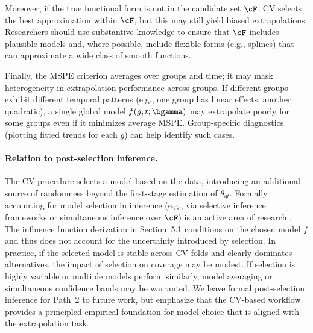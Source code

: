 Moreover, if the true functional form is not in the candidate set $\cF$, CV selects the best approximation within $\cF$, but this may still yield biased extrapolations. Researchers should use substantive knowledge to ensure that $\cF$ includes plausible models and, where possible, include flexible forms (e.g., splines) that can approximate a wide class of smooth functions.

Finally, the MSPE criterion averages over groups and time; it may mask heterogeneity in extrapolation performance across groups. If different groups exhibit different temporal patterns (e.g., one group has linear effects, another quadratic), a single global model $f(g,t;\bgamma)$ may extrapolate poorly for some groups even if it minimizes average MSPE. Group-specific diagnostics (plotting fitted trends for each $g$) can help identify such cases.

\paragraph{Relation to post-selection inference.}
The CV procedure selects a model based on the data, introducing an additional source of randomness beyond the first-stage estimation of $\theta_{gt}$. Formally accounting for model selection in inference (e.g., via selective inference frameworks or simultaneous inference over $\cF$) is an active area of research \citep{tibshiraniExactPostselectionInference2016,chenValidInferenceModel2021}. The influence function derivation in Section~5.1 conditions on the chosen model $f$ and thus does not account for the uncertainty introduced by selection. In practice, if the selected model is stable across CV folds and clearly dominates alternatives, the impact of selection on coverage may be modest. If selection is highly variable or multiple models perform similarly, model averaging or simultaneous confidence bands may be warranted. We leave formal post-selection inference for Path~2 to future work, but emphasize that the CV-based workflow provides a principled empirical foundation for model choice that is aligned with the extrapolation task.
